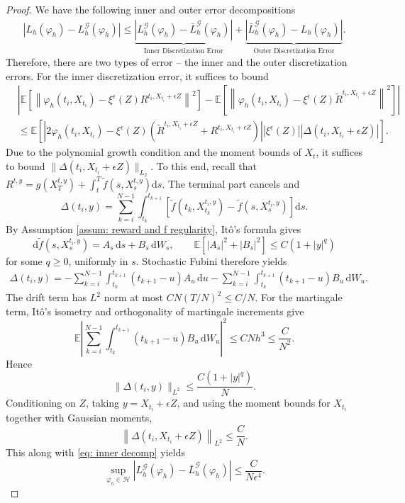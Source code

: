 \documentclass[10pt,a4paper]{amsart}
\newcommand{\E}{\mathbb{E}}
\newcommand{\dd}{\mathrm{d}}
\begin{document}
\begin{proof}
We have the following inner and outer error decompositions
\begin{equation}
    \begin{aligned}
        \left|L_h(\varphi_h) - L_h^{\mathcal{G}}(\varphi_h)\right|\le \underbrace{\left|L_h^{\mathscr G}(\varphi_h)-\bar L_h^{\mathscr G}(\varphi_h) \right|}_{\textrm{Inner Discretization Error}}+ \underbrace{\left| \bar L_h^{\mathscr G}(\varphi_h)-L_h(\varphi_h)\right|}_{\textrm{Outer Discretization Error}}.
    \end{aligned}
\end{equation}
Therefore, there are two types of error -- the inner and the outer discretization errors.
For the inner discretization error, it suffices to bound
\begin{equation}\label{eq: inner decomp}
\begin{aligned}
     &\left| \E \left[ \left\| \varphi_h(t_i, X_{t_i}) - \xi^\epsilon(Z)R^{t_i, X_{t_i}+\epsilon Z} \right\|^2 \right] - \E \left[ \left\| \varphi_h(t_i, X_{t_i}) - \xi^\epsilon(Z)\tilde R^{t_i, X_{t_i}+\epsilon Z} \right\|^2 \right]\right|\\
     &\le \E\left[ \left| 2\varphi_h(t_i,X_{t_i}) - \xi^{\epsilon}(Z)(\tilde R^{t_i,X_{t_i}+ \epsilon Z} + R^{t_i,X_{t_i} + \epsilon Z})\right|\left| \xi^{\epsilon}(Z)\right|\left|\Delta(t_i,X_{t_i}+\epsilon Z)\right|\right].
\end{aligned}
\end{equation}
Due to the polynomial growth condition and the moment bounds of $ X_t$, it suffices to bound $ \|\Delta(t_i,X_{t_i} + \epsilon Z)\|_{L_2}$.
To this end,
recall that $R^{t,y} = g(X_T^{t,y}) + \int_t^T \tilde f(s, X_s^{t,y}) \dd s$. The terminal part cancels and
\[
    \Delta(t_i,y)
    =
    \sum_{k=i}^{N-1}
    \int_{t_k}^{t_{k+1}}
    \left[
    \tilde f(t_k,X_{t_k}^{t_i,y})
    -
    \tilde f(s,X_s^{t_i,y})
    \right]\dd s .
\]
By Assumption \ref{assum: reward and f regularity}, It\^o's formula gives
\[
    \dd \tilde f(s,X_s^{t_i,y})
    =
    A_s\,\dd s+ B_{s}\,\dd W_s,
    \qquad
    \E\left[|A_s|^2+|B_{s}|^2\right]
    \le C(1+|y|^q)
\]
for some $q\ge0$, uniformly in $s$.
Stochastic Fubini therefore yields
\[
\begin{aligned}
    \Delta(t_i,y)
    =
    -\sum_{k=i}^{N-1}
    \int_{t_k}^{t_{k+1}}(t_{k+1}-u)A_u\,\dd u
    -\sum_{k=i}^{N-1}
    \int_{t_k}^{t_{k+1}}(t_{k+1}-u)B_{u}\,\dd W_u .
\end{aligned}
\]
The drift term has $L^2$ norm at most $CN(T/N)^2\le C/N$.
For the martingale term, It\^o's isometry and orthogonality of martingale
increments give
\[
    \E\left|
    \sum_{k=i}^{N-1}
    \int_{t_k}^{t_{k+1}}(t_{k+1}-u)B_{u}\,\dd W_u
    \right|^2
    \le
    CNh^3
    \le
    \frac{C}{N^2}.
\]
Hence
\[
    \|\Delta(t_i,y)\|_{L^2}
    \le
    \frac{C(1+|y|^q)}{N}.
\]
Conditioning on $Z$, taking $y=X_{t_i}+\epsilon Z$, and using the moment
bounds for $X_{t_i}$ together with Gaussian moments,
\[
    \left\|
    \Delta(t_i,X_{t_i}+\epsilon Z)
    \right\|_{L^2}
    \le
    \frac{C}{N}.
\]
This along with \eqref{eq: inner decomp} yields
\[
    \sup_{\varphi_h\in\mathcal H}
    |L_h^{\mathscr G}(\varphi_h)-\bar L_h^{\mathscr G}(\varphi_h)|
    \le
    \frac{C}{N\epsilon^4}.
\]



\end{proof}
\end{document}
